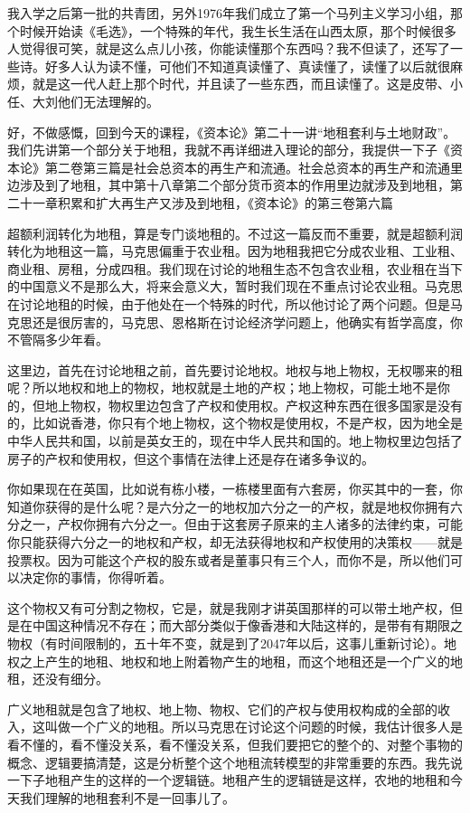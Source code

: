 \documentclass[UTF8, 12pt, a4paper]{ctexrep}
\begin{document}
我入学之后第一批的共青团，另外1976年我们成立了第一个马列主义学习小组，那个时候开始读《毛选》，一个特殊的年代，我生长生活在山西太原，那个时候很多人觉得很可笑，就是这么点儿小孩，你能读懂那个东西吗？我不但读了，还写了一些诗。好多人认为读不懂，可他们不知道真读懂了、真读懂了，读懂了以后就很麻烦，就是这一代人赶上那个时代，并且读了一些东西，而且读懂了。这是皮带、小任、大刘他们无法理解的。

好，不做感慨，回到今天的课程，《资本论》第二十一讲“地租套利与土地财政”。我们先讲第一个部分关于地租，我就不再详细进入理论的部分，我提供一下子《资本论》第二卷第三篇是社会总资本的再生产和流通。社会总资本的再生产和流通里边涉及到了地租，其中第十八章第二个部分货币资本的作用里边就涉及到地租，第二十一章积累和扩大再生产又涉及到地租，《资本论》的第三卷第六篇

超额利润转化为地租，算是专门谈地租的。不过这一篇反而不重要，就是超额利润转化为地租这一篇，马克思偏重于农业租。因为地租我把它分成农业租、工业租、商业租、房租，分成四租。我们现在讨论的地租生态不包含农业租，农业租在当下的中国意义不是那么大，将来会意义大，暂时我们现在不重点讨论农业租。马克思在讨论地租的时候，由于他处在一个特殊的时代，所以他讨论了两个问题。但是马克思还是很厉害的，马克思、恩格斯在讨论经济学问题上，他确实有哲学高度，你不管隔多少年看。

这里边，首先在讨论地租之前，首先要讨论地权。地权与地上物权，无权哪来的租呢？所以地权和地上的物权，地权就是土地的产权；地上物权，可能土地不是你的，但地上物权，物权里边包含了产权和使用权。产权这种东西在很多国家是没有的，比如说香港，你只有个地上物权，这个物权是使用权，不是产权，因为地全是中华人民共和国，以前是英女王的，现在中华人民共和国的。地上物权里边包括了房子的产权和使用权，但这个事情在法律上还是存在诸多争议的。

你如果现在在英国，比如说有栋小楼，一栋楼里面有六套房，你买其中的一套，你知道你获得的是什么呢？是六分之一的地权加六分之一的产权，就是地权你拥有六分之一，产权你拥有六分之一。但由于这套房子原来的主人诸多的法律约束，可能你只能获得六分之一的地权和产权，却无法获得地权和产权使用的决策权——就是投票权。因为可能这个产权的股东或者是董事只有三个人，而你不是，所以他们可以决定你的事情，你得听着。

这个物权又有可分割之物权，它是，就是我刚才讲英国那样的可以带土地产权，但是在中国这种情况不存在；而大部分类似于像香港和大陆这样的，是带有有期限之物权（有时间限制的，五十年不变，就是到了2047年以后，这事儿重新讨论）。地权之上产生的地租、地权和地上附着物产生的地租，而这个地租还是一个广义的地租，还没有细分。

广义地租就是包含了地权、地上物、物权、它们的产权与使用权构成的全部的收入，这叫做一个广义的地租。所以马克思在讨论这个问题的时候，我估计很多人是看不懂的，看不懂没关系，看不懂没关系，但我们要把它的整个的、对整个事物的概念、逻辑要搞清楚，这是分析整个这个地租流转模型的非常重要的东西。我先说一下子地租产生的这样的一个逻辑链。地租产生的逻辑链是这样，农地的地租和今天我们理解的地租套利不是一回事儿了。
\end{document}
